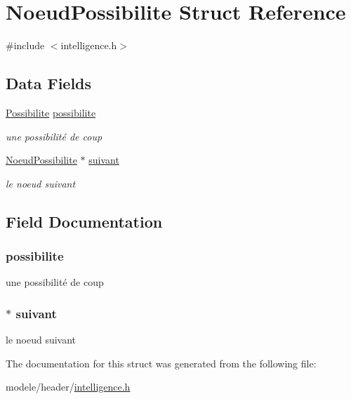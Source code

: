 \hypertarget{struct_noeud_possibilite}{\section{Noeud\-Possibilite Struct Reference}
\label{struct_noeud_possibilite}
}


{\ttfamily \#include $<$intelligence.\-h$>$}

\subsection*{Data Fields}
\begin{DoxyCompactItemize}
\item 
\hyperlink{struct_possibilite}{Possibilite} \hyperlink{struct_noeud_possibilite_ae1d935655b5f33697a855aa801562fae}{possibilite}
\begin{DoxyCompactList}\small\item\em une possibilité de coup \end{DoxyCompactList}\item 
\hyperlink{struct_noeud_possibilite}{Noeud\-Possibilite} $\ast$ \hyperlink{struct_noeud_possibilite_afd68e56f87f90c95b55b54d51b10d085}{suivant}
\begin{DoxyCompactList}\small\item\em le noeud suivant \end{DoxyCompactList}\end{DoxyCompactItemize}


\subsection{Field Documentation}
\hypertarget{struct_noeud_possibilite_ae1d935655b5f33697a855aa801562fae}{
\subsubsection[{possibilite}]{ possibilite}}\label{struct_noeud_possibilite_ae1d935655b5f33697a855aa801562fae}


une possibilité de coup 

\hypertarget{struct_noeud_possibilite_afd68e56f87f90c95b55b54d51b10d085}{
\subsubsection[{suivant}]{$\ast$ suivant}}\label{struct_noeud_possibilite_afd68e56f87f90c95b55b54d51b10d085}


le noeud suivant 



The documentation for this struct was generated from the following file\-:\begin{DoxyCompactItemize}
\item 
modele/header/\hyperlink{intelligence_8h}{intelligence.\-h}\end{DoxyCompactItemize}
